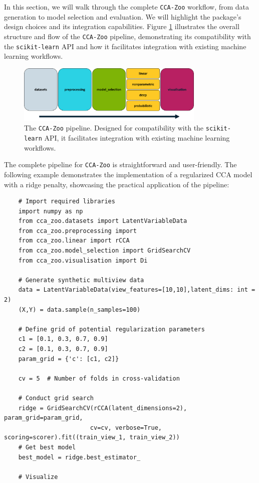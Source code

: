In this section, we will walk through the complete \texttt{CCA-Zoo} workflow, from data generation to model selection and evaluation.
We will highlight the package's design choices and its integration capabilities. Figure \ref{fig:cca-zoo-pipeline} illustrates the overall structure and flow of the \texttt{CCA-Zoo} pipeline, demonstrating its compatibility with the \texttt{scikit-learn} API and how it facilitates integration with existing machine learning workflows.

\begin{figure}[ht]
    \centering
    \includegraphics[width=0.8\textwidth]{figures/pipeline}
    \caption[The \texttt{CCA-Zoo} pipeline]{The \texttt{CCA-Zoo} pipeline. Designed for compatibility with the \texttt{scikit-learn} API, it facilitates integration with existing machine learning workflows.}\label{fig:cca-zoo-pipeline}
\end{figure}

The complete pipeline for \texttt{CCA-Zoo} is straightforward and user-friendly.
The following example demonstrates the implementation of a regularized CCA model with a ridge penalty, showcasing the practical application of the pipeline:

\begin{verbatim}
    # Import required libraries
    import numpy as np
    from cca_zoo.datasets import LatentVariableData
    from cca_zoo.preprocessing import
    from cca_zoo.linear import rCCA
    from cca_zoo.model_selection import GridSearchCV
    from cca_zoo.visualisation import Di
    
    # Generate synthetic multiview data
    data = LatentVariableData(view_features=[10,10],latent_dims: int = 2)
    (X,Y) = data.sample(n_samples=100)

    # Define grid of potential regularization parameters
    c1 = [0.1, 0.3, 0.7, 0.9]
    c2 = [0.1, 0.3, 0.7, 0.9]
    param_grid = {'c': [c1, c2]}

    cv = 5  # Number of folds in cross-validation

    # Conduct grid search
    ridge = GridSearchCV(rCCA(latent_dimensions=2), param_grid=param_grid,
                        cv=cv, verbose=True, scoring=scorer).fit((train_view_1, train_view_2))
    # Get best model
    best_model = ridge.best_estimator_

    # Visualize


    \end{verbatim}

